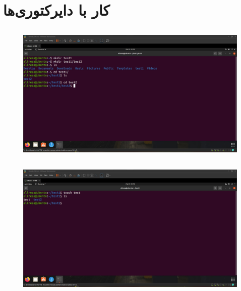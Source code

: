 \documentclass{article}
\begin{document}
\section{کار با دایرکتوری‌ها}

\subsection{}
\begin{figure}[H]
    \centering
    \includegraphics[width=1.0\textwidth]{figures/3a.jpg}
    \caption
	{
	}
    \label{fig:fig1}
\end{figure}

\subsection{}
\begin{figure}[H]
    \centering
    \includegraphics[width=1.0\textwidth]{figures/3b.jpg}
    \caption
	{
	}
    \label{fig:fig1}
\end{figure}
\end{document}

